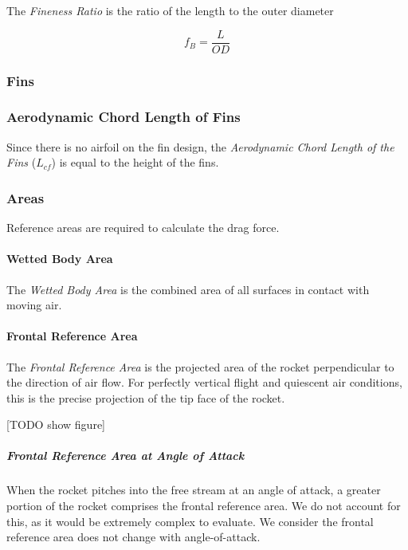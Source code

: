 \documentclass[]{article}
\let\oldparagraph\paragraph
\renewcommand{\paragraph}[1]{\oldparagraph{#1}\mbox{}}
\let\oldsubparagraph\subparagraph
\renewcommand{\subparagraph}[1]{\oldsubparagraph{#1}\mbox{}}
\begin{document}
The \emph{Fineness Ratio} is the ratio of the length to the outer
diameter

\begin{equation} 
f_B = \dfrac{L} {OD}
\end{equation}

\subsubsection{Fins}\label{fins-1}

\subsubsection{Aerodynamic Chord Length of
Fins}\label{aerodynamic-chord-length-of-fins}

Since there is no airfoil on the fin design, the \emph{Aerodynamic Chord
Length of the Fins} (\(L_{cf}\)) is equal to the height of the fins.

\subsubsection{Areas}\label{areas}

Reference areas are required to calculate the drag force.

\paragraph{Wetted Body Area}\label{wetted-body-area}

The \emph{Wetted Body Area} is the combined area of all surfaces in
contact with moving air.

\paragraph{Frontal Reference Area}\label{frontal-reference-area}

The \emph{Frontal Reference Area} is the projected area of the rocket
perpendicular to the direction of air flow. For perfectly vertical
flight and quiescent air conditions, this is the precise projection of
the tip face of the rocket.

{[}TODO show figure{]}

\subparagraph{Frontal Reference Area at Angle of
Attack}\label{frontal-reference-area-at-angle-of-attack}

When the rocket pitches into the free stream at an angle of attack, a
greater portion of the rocket comprises the frontal reference area. We
do not account for this, as it would be extremely complex to evaluate.
We consider the frontal reference area does not change with
angle-of-attack.
\end{document}
